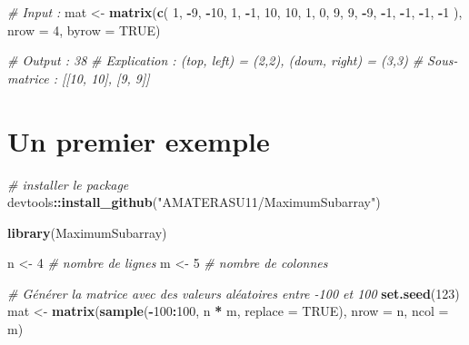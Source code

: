 \documentclass[
]{article}
\newenvironment{Shaded}{\begin{snugshade}}{\end{snugshade}}
\newcommand{\AttributeTok}[1]{\textcolor[rgb]{0.13,0.29,0.53}{#1}}
\newcommand{\CommentTok}[1]{\textcolor[rgb]{0.56,0.35,0.01}{\textit{#1}}}
\newcommand{\ConstantTok}[1]{\textcolor[rgb]{0.56,0.35,0.01}{#1}}
\newcommand{\DecValTok}[1]{\textcolor[rgb]{0.00,0.00,0.81}{#1}}
\newcommand{\FunctionTok}[1]{\textcolor[rgb]{0.13,0.29,0.53}{\textbf{#1}}}
\newcommand{\NormalTok}[1]{#1}
\newcommand{\OtherTok}[1]{\textcolor[rgb]{0.56,0.35,0.01}{#1}}
\newcommand{\SpecialCharTok}[1]{\textcolor[rgb]{0.81,0.36,0.00}{\textbf{#1}}}
\newcommand{\StringTok}[1]{\textcolor[rgb]{0.31,0.60,0.02}{#1}}
\begin{document}
\begin{Shaded}
\begin{Highlighting}[]
\CommentTok{\# Input :}
\NormalTok{mat }\OtherTok{\textless{}{-}} \FunctionTok{matrix}\NormalTok{(}\FunctionTok{c}\NormalTok{(}
   \DecValTok{1}\NormalTok{, }\SpecialCharTok{{-}}\DecValTok{9}\NormalTok{, }\SpecialCharTok{{-}}\DecValTok{10}\NormalTok{, }\DecValTok{1}\NormalTok{,}
  \SpecialCharTok{{-}}\DecValTok{1}\NormalTok{,  }\DecValTok{10}\NormalTok{,  }\DecValTok{10}\NormalTok{, }\DecValTok{1}\NormalTok{,}
   \DecValTok{0}\NormalTok{,   }\DecValTok{9}\NormalTok{,   }\DecValTok{9}\NormalTok{, }\SpecialCharTok{{-}}\DecValTok{9}\NormalTok{,}
  \SpecialCharTok{{-}}\DecValTok{1}\NormalTok{,  }\SpecialCharTok{{-}}\DecValTok{1}\NormalTok{,  }\SpecialCharTok{{-}}\DecValTok{1}\NormalTok{, }\SpecialCharTok{{-}}\DecValTok{1}
\NormalTok{), }\AttributeTok{nrow =} \DecValTok{4}\NormalTok{, }\AttributeTok{byrow =} \ConstantTok{TRUE}\NormalTok{)}

\CommentTok{\# Output : 38}
\CommentTok{\# Explication : (top, left) = (2,2), (down, right) = (3,3)}
\CommentTok{\# Sous{-}matrice : [[10, 10], [9, 9]]}
\end{Highlighting}
\end{Shaded}

\section{Un premier exemple}\label{un-premier-exemple}

\begin{Shaded}
\begin{Highlighting}[]
\CommentTok{\# installer le package}
\NormalTok{devtools}\SpecialCharTok{::}\FunctionTok{install\_github}\NormalTok{(}\StringTok{"AMATERASU11/MaximumSubarray"}\NormalTok{)}
\end{Highlighting}
\end{Shaded}

\begin{Shaded}
\begin{Highlighting}[]
\FunctionTok{library}\NormalTok{(MaximumSubarray)}
\end{Highlighting}
\end{Shaded}

\begin{Shaded}
\begin{Highlighting}[]
\NormalTok{n }\OtherTok{\textless{}{-}} \DecValTok{4}   \CommentTok{\# nombre de lignes}
\NormalTok{m }\OtherTok{\textless{}{-}} \DecValTok{5}   \CommentTok{\# nombre de colonnes}

\CommentTok{\# Générer la matrice avec des valeurs aléatoires entre {-}100 et 100}
\FunctionTok{set.seed}\NormalTok{(}\DecValTok{123}\NormalTok{)  }
\NormalTok{mat }\OtherTok{\textless{}{-}} \FunctionTok{matrix}\NormalTok{(}\FunctionTok{sample}\NormalTok{(}\SpecialCharTok{{-}}\DecValTok{100}\SpecialCharTok{:}\DecValTok{100}\NormalTok{, n }\SpecialCharTok{*}\NormalTok{ m, }\AttributeTok{replace =} \ConstantTok{TRUE}\NormalTok{), }\AttributeTok{nrow =}\NormalTok{ n, }\AttributeTok{ncol =}\NormalTok{ m)}
\end{Highlighting}
\end{Shaded}
\end{document}
